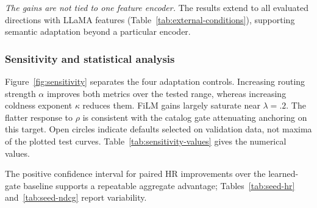\noindent\textit{The gains are not tied to one feature encoder.}
The results extend to all evaluated directions with LLaMA features (Table~\ref{tab:external-conditions}), supporting semantic adaptation beyond a particular encoder.

\subsubsection{Sensitivity and statistical analysis}
\label{sec:exp-sens}\label{sec:exp-variability}







Figure~\ref{fig:sensitivity} separates the four adaptation controls. Increasing routing strength $\alpha$ improves both metrics over the tested range, whereas increasing coldness exponent $\kappa$ reduces them. FiLM gains largely saturate near $\lambda=.2$. The flatter response to $\rho$ is consistent with the catalog gate attenuating anchoring on this target. Open circles indicate defaults selected on validation data, not maxima of the plotted test curves. Table~\ref{tab:sensitivity-values} gives the numerical values.

The positive confidence interval for paired HR improvements over the learned-gate baseline supports a repeatable aggregate advantage; Tables~\ref{tab:seed-hr} and~\ref{tab:seed-ndcg} report variability.
